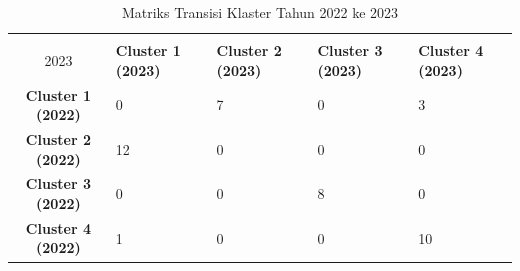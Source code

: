 \begin{table}[H]
\centering
\caption{Matriks Transisi Klaster Tahun 2022 ke 2023} \label{tab:transisi_2022_2023}
\begin{tabular}{|c|p{2cm}|p{2cm}|p{2cm}|p{2cm}|}
\hline
\textbf{Tahun 2022 \\ 2023} & \textbf{Cluster 1 (2023)} & \textbf{Cluster 2 (2023)} & \textbf{Cluster 3 (2023)} & \textbf{Cluster 4 (2023)} \\ \hline
\textbf{Cluster 1 (2022)} & 0 & 7 & 0 & 3 \\ \hline
\textbf{Cluster 2 (2022)} & 12 & 0 & 0 & 0 \\ \hline
\textbf{Cluster 3 (2022)} & 0 & 0 & 8 & 0 \\ \hline
\textbf{Cluster 4 (2022)} & 1 & 0 & 0 & 10 \\ \hline
\end{tabular}
\end{table}